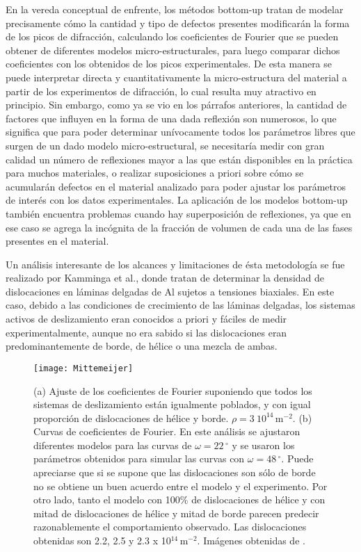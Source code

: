 En la vereda conceptual de enfrente, los métodos bottom-up tratan de modelar precisamente cómo la cantidad y tipo de defectos presentes modificarán la forma de los picos de difracción, calculando los coeficientes de Fourier que se pueden obtener de diferentes modelos micro-estructurales, para luego comparar dichos coeficientes con los obtenidos de los picos experimentales.
De esta manera se puede interpretar directa y cuantitativamente la micro-estructura del material a partir de los experimentos de difracción, lo cual resulta muy atractivo en principio.
Sin embargo, como ya se vio en los párrafos anteriores, la cantidad de factores que influyen en la forma de una dada reflexión son numerosos, lo que significa que para poder determinar unívocamente todos los parámetros libres que surgen de un dado modelo micro-estructural, se necesitaría medir con gran calidad un número de reflexiones mayor a las que están disponibles en la práctica para muchos materiales, o realizar suposiciones a priori sobre cómo se acumularán defectos en el material analizado para poder ajustar los parámetros de interés con los datos experimentales.
La aplicación de los modelos bottom-up también encuentra problemas cuando hay superposición de reflexiones, ya que en ese caso se agrega la incógnita de la fracción de volumen de cada una de las fases presentes en el material.

Un análisis interesante de los alcances y limitaciones de ésta metodología se fue realizado por Kamminga et al.\cite{mittemeijer2003diffraction}, donde tratan de determinar la densidad de dislocaciones en láminas delgadas de Al sujetos a tensiones biaxiales.
En este caso, debido a las condiciones de crecimiento de las láminas delgadas, los sistemas activos de deslizamiento eran conocidos a priori y fáciles de medir experimentalmente, aunque no era sabido si las dislocaciones eran predominantemente de borde, de hélice o una mezcla de ambas.

\begin{figure}[!htb]
  \centering
  \texttt{[image: Mittemeijer]}
  \caption{(a) Ajuste de los coeficientes de Fourier suponiendo que todos los sistemas de deslizamiento están igualmente poblados, y con igual proporción de dislocaciones de hélice y borde. $\rho = 3 \ 10^{14}$\,m$^{-2}$. (b) Curvas de coeficientes de Fourier. En este análisis se ajustaron diferentes modelos para las curvas de $\omega = 22\,^{\circ}$ y se usaron los parámetros obtenidos para simular las curvas con $\omega = 48\,^{\circ}$. Puede apreciarse que si se supone que las dislocaciones son sólo de borde no se obtiene un buen acuerdo entre el modelo y el experimento. Por otro lado, tanto el modelo con 100\% de dislocaciones de hélice y con mitad de dislocaciones de hélice y mitad de borde parecen predecir razonablemente el comportamiento observado. Las dislocaciones obtenidas son 2.2, 2.5 y 2.3 x 10$^{14}$\,m$^{-2}$. Imágenes obtenidas de \cite{mittemeijer2003diffraction}.}
  \label{fig:FourierMittemeijer}
\end{figure}


